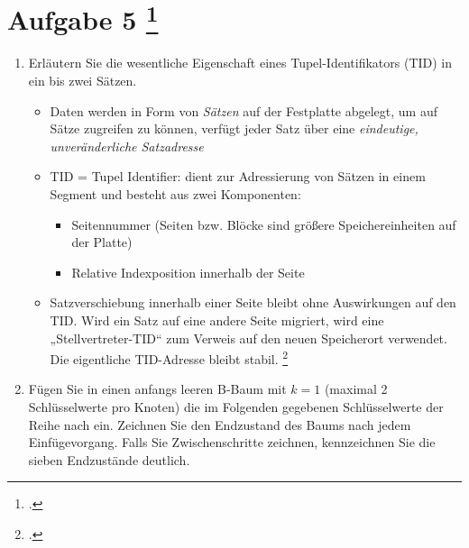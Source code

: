 \documentclass{lehramt-informatik-aufgabe}
\begin{document}
\section{Aufgabe 5
\footcite{66114:2016:09}}

\begin{enumerate}


\item Erläutern Sie die wesentliche Eigenschaft eines
Tupel-Identifikators (TID) in ein bis zwei Sätzen.

\begin{liAntwort}
\begin{itemize}
\item Daten werden in Form von \emph{Sätzen} auf der Festplatte
abgelegt, um auf Sätze zugreifen zu können, verfügt jeder Satz über eine
\emph{eindeutige, unveränderliche Satzadresse}

\item TID = Tupel Identifier: dient zur Adressierung von Sätzen in einem
Segment und besteht aus zwei Komponenten:

\begin{itemize}
\item Seitennummer (Seiten bzw. Blöcke sind größere Speichereinheiten
auf der Platte)

\item Relative Indexposition innerhalb der Seite
\end{itemize}

\item Satzverschiebung innerhalb einer Seite bleibt ohne Auswirkungen
auf den TID. Wird ein Satz auf eine andere Seite migriert, wird eine
„Stellvertreter-TID“ zum Verweis auf den neuen Speicherort verwendet.
Die eigentliche TID-Adresse bleibt stabil.
\footcite[Seite 219]{kemper}
\end{itemize}
\end{liAntwort}


\item Fügen Sie in einen anfangs leeren B-Baum mit $k = 1$ (maximal 2
Schlüsselwerte pro Knoten) die im Folgenden gegebenen Schlüsselwerte der
Reihe nach ein. Zeichnen Sie den Endzustand des Baums nach jedem
Einfügevorgang. Falls Sie Zwischenschritte zeichnen, kennzeichnen Sie
die sieben Endzustände deutlich.


\end{enumerate}
\end{document}
